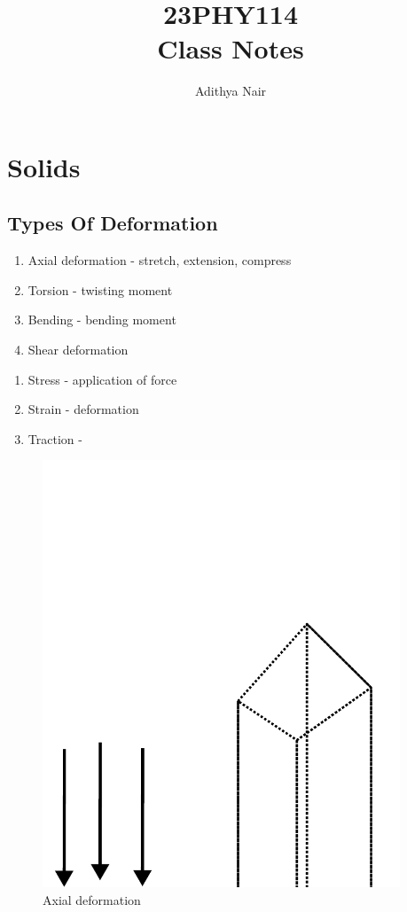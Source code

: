 \documentclass{report}
\title{\Huge{23PHY114}\\ Class Notes}
\author{\huge{Adithya Nair}}
\date{}
\begin{document}
\maketitle
\newpage%
\tableofcontents
\chapter{Solids}
\section{Types Of Deformation}
\begin{enumerate}
	\item Axial deformation - stretch, extension, compress
	\item Torsion - twisting moment
	\item Bending - bending moment
	\item Shear deformation
\end{enumerate}
\begin{enumerate}
	\item Stress - application of force
	\item Strain - deformation
	\item Traction - 
\end{enumerate}
\begin{figure}
		\includegraphics[width=0.95\textwidth]{figures/axialdeformation.pdf}
	\caption{Axial deformation}\label{fig:}
\end{figure}
\end{document}
